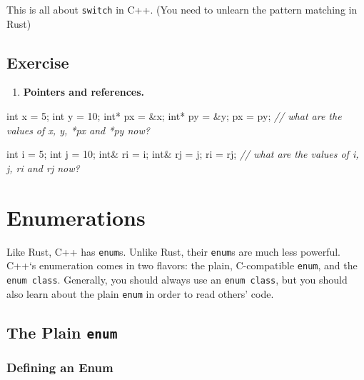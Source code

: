\documentclass[
]{book}
\newenvironment{Shaded}{\begin{snugshade}}{\end{snugshade}}
\newcommand{\CommentTok}[1]{\textcolor[rgb]{0.56,0.35,0.01}{\textit{#1}}}
\newcommand{\DataTypeTok}[1]{\textcolor[rgb]{0.13,0.29,0.53}{#1}}
\newcommand{\DecValTok}[1]{\textcolor[rgb]{0.00,0.00,0.81}{#1}}
\newcommand{\NormalTok}[1]{#1}
\providecommand{\tightlist}{%
  \setlength{\itemsep}{0pt}\setlength{\parskip}{0pt}}
\begin{document}
This is all about \texttt{switch} in C++. (You need to unlearn the pattern matching in Rust)

\hypertarget{exercise}{%
\section*{Exercise}\label{exercise}}

\begin{enumerate}
\def\labelenumi{\arabic{enumi}.}
\tightlist
\item
  \textbf{Pointers and references.}
\end{enumerate}

\begin{Shaded}
\begin{Highlighting}[]
\DataTypeTok{int}\NormalTok{ x = }\DecValTok{5}\NormalTok{;}
\DataTypeTok{int}\NormalTok{ y = }\DecValTok{10}\NormalTok{;}
\DataTypeTok{int}\NormalTok{* px = \&x;}
\DataTypeTok{int}\NormalTok{* py = \&y;}
\NormalTok{px = py;}
\CommentTok{// what are the values of x, y, *px and *py now?}

\DataTypeTok{int}\NormalTok{ i = }\DecValTok{5}\NormalTok{;}
\DataTypeTok{int}\NormalTok{ j = }\DecValTok{10}\NormalTok{;}
\DataTypeTok{int}\NormalTok{\& ri = i;}
\DataTypeTok{int}\NormalTok{\& rj = j;}
\NormalTok{ri = rj;}
\CommentTok{// what are the values of i, j, ri and rj now?}
\end{Highlighting}
\end{Shaded}

\hypertarget{enumerations}{%
\chapter{Enumerations}\label{enumerations}}

Like Rust, C++ has \texttt{enum}s. Unlike Rust, their \texttt{enum}s are much less powerful. C++`s enumeration
comes in two flavors: the plain, C-compatible \texttt{enum}, and the \texttt{enum\ class}. Generally, you should
always use an \texttt{enum\ class}, but you should also learn about the plain \texttt{enum} in order to read
others' code.

\hypertarget{the-plain-enum}{%
\section{\texorpdfstring{The Plain \texttt{enum}}{The Plain enum}}\label{the-plain-enum}}

\hypertarget{defining-an-enum}{%
\subsection{Defining an Enum}\label{defining-an-enum}}
\end{document}
